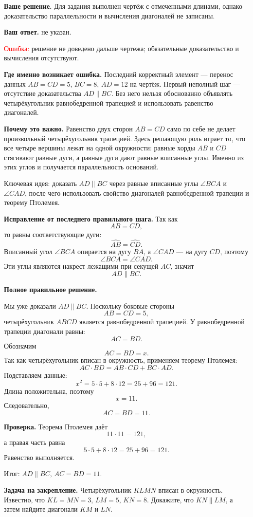 \documentclass[12pt,a4paper]{article}
\newcommand{\errlabel}[1]{\textcolor{red}{Ошибка:} #1}
\newcommand{\keyidea}[1]{\textcolor{blue!60!black}{Ключевая идея:} #1}
\newcommand{\resultlabel}[1]{\textcolor{teal!60!black}{Итог:} #1}
\begin{document}
\textbf{Ваше решение.} Для задания выполнен чертёж с отмеченными длинами, однако доказательство параллельности и вычисления диагоналей не записаны.

\textbf{Ваш ответ.} не указан.

\errlabel{решение не доведено дальше чертежа; обязательные доказательство и вычисления отсутствуют.}

\textbf{Где именно возникает ошибка.} Последний корректный элемент --- перенос данных $AB=CD=5$, $BC=8$, $AD=12$ на чертёж. Первый неполный шаг --- отсутствие доказательства $AD\parallel BC$. Без него нельзя обоснованно объявлять четырёхугольник равнобедренной трапецией и использовать равенство диагоналей.

\textbf{Почему это важно.} Равенство двух сторон $AB=CD$ само по себе не делает произвольный четырёхугольник трапецией. Здесь решающую роль играет то, что все четыре вершины лежат на одной окружности: равные хорды $AB$ и $CD$ стягивают равные дуги, а равные дуги дают равные вписанные углы. Именно из этих углов и получается параллельность оснований.

\keyidea{доказать $AD\parallel BC$ через равные вписанные углы $\angle BCA$ и $\angle CAD$, после чего использовать свойство диагоналей равнобедренной трапеции и теорему Птолемея.}

\textbf{Исправление от последнего правильного шага.} Так как
\[
AB=CD,
\]
то равны соответствующие дуги:
\[
\widehat{AB}=\widehat{CD}.
\]
Вписанный угол $\angle BCA$ опирается на дугу $BA$, а $\angle CAD$ --- на дугу $CD$, поэтому
\[
\angle BCA=\angle CAD.
\]
Эти углы являются накрест лежащими при секущей $AC$, значит
\[
AD\parallel BC.
\]

\textbf{Полное правильное решение.}

Мы уже доказали $AD\parallel BC$. Поскольку боковые стороны
\[
AB=CD=5,
\]
четырёхугольник $ABCD$ является равнобедренной трапецией. У равнобедренной трапеции диагонали равны:
\[
AC=BD.
\]
Обозначим
\[
AC=BD=x.
\]
Так как четырёхугольник вписан в окружность, применяем теорему Птолемея:
\[
AC\cdot BD=AB\cdot CD+BC\cdot AD.
\]
Подставляем данные:
\[
x^2=5\cdot5+8\cdot12=25+96=121.
\]
Длина положительна, поэтому
\[
x=11.
\]
Следовательно,
\[
AC=BD=11.
\]

\textbf{Проверка.} Теорема Птолемея даёт
\[
11\cdot11=121,
\]
а правая часть равна
\[
5\cdot5+8\cdot12=25+96=121.
\]
Равенство выполняется.

\resultlabel{$AD\parallel BC$, $AC=BD=11$.}

\textbf{Задача на закрепление.} Четырёхугольник $KLMN$ вписан в окружность. Известно, что $KL=MN=3$, $LM=5$, $KN=8$. Докажите, что $KN\parallel LM$, а затем найдите диагонали $KM$ и $LN$.
\end{document}
